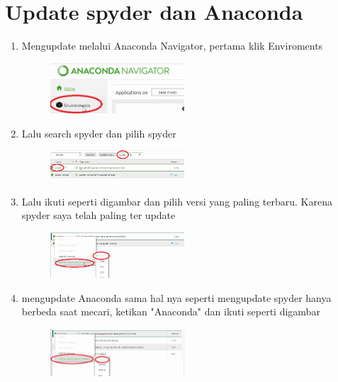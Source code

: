 \chapter*{Update spyder dan Anaconda }

\begin{enumerate}
	\item Mengupdate melalui Anaconda Navigator, pertama klik Enviroments
	\begin{figure} [h]
	\includegraphics[width=5cm]{update/1.png}
	\centering
	\end{figure}
	
	\item Lalu search spyder dan pilih spyder 
	\begin{figure} [h]
	\includegraphics[width=5cm]{update/2.png}
	\centering
	\end{figure}

	\item Lalu ikuti seperti digambar dan pilih versi yang paling terbaru. Karena spyder saya telah paling ter update  
	\begin{figure} [h]
	\includegraphics[width=5cm]{update/3.png}
	\centering
	\end{figure}
	
	\item mengupdate Anaconda sama hal nya seperti mengupdate spyder hanya berbeda saat mecari, ketikan "Anaconda" dan ikuti seperti digambar
	\begin{figure} [h]
	\includegraphics[width=5cm]{update/4.png}
	\centering
	\end{figure}
	

\end{enumerate}

